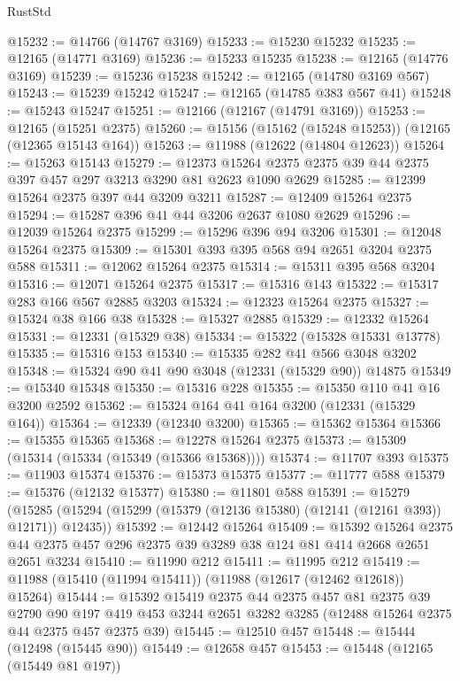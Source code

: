 \begin{lexlean}{RustStd}
\begin{coremodule}
@15232 := @14766 (@14767 @3169)
@15233 := @15230 @15232
@15235 := @12165 (@14771 @3169)
@15236 := @15233 @15235
@15238 := @12165 (@14776 @3169)
@15239 := @15236 @15238
@15242 := @12165 (@14780 @3169 @567)
@15243 := @15239 @15242
@15247 := @12165 (@14785 @383 @567 @41)
@15248 := @15243 @15247
@15251 := @12166 (@12167 (@14791 @3169))
@15253 := @12165 (@15251 @2375)
@15260 := @15156 (@15162 (@15248 @15253)) (@12165 (@12365 @15143 @164))
@15263 := @11988 (@12622 (@14804 @12623))
@15264 := @15263 @15143
@15279 := @12373 @15264 @2375 @2375 @39 @44 @2375 @397 @457 @297 @3213 @3290 @81 @2623 @1090 @2629
@15285 := @12399 @15264 @2375 @397 @44 @3209 @3211
@15287 := @12409 @15264 @2375
@15294 := @15287 @396 @41 @44 @3206 @2637 @1080 @2629
@15296 := @12039 @15264 @2375
@15299 := @15296 @396 @94 @3206
@15301 := @12048 @15264 @2375
@15309 := @15301 @393 @395 @568 @94 @2651 @3204 @2375 @588
@15311 := @12062 @15264 @2375
@15314 := @15311 @395 @568 @3204
@15316 := @12071 @15264 @2375
@15317 := @15316 @143
@15322 := @15317 @283 @166 @567 @2885 @3203
@15324 := @12323 @15264 @2375
@15327 := @15324 @38 @166 @38
@15328 := @15327 @2885
@15329 := @12332 @15264
@15331 := @12331 (@15329 @38)
@15334 := @15322 (@15328 @15331 @13778)
@15335 := @15316 @153
@15340 := @15335 @282 @41 @566 @3048 @3202
@15348 := @15324 @90 @41 @90 @3048 (@12331 (@15329 @90)) @14875
@15349 := @15340 @15348
@15350 := @15316 @228
@15355 := @15350 @110 @41 @16 @3200 @2592
@15362 := @15324 @164 @41 @164 @3200 (@12331 (@15329 @164))
@15364 := @12339 (@12340 @3200)
@15365 := @15362 @15364
@15366 := @15355 @15365
@15368 := @12278 @15264 @2375
@15373 := @15309 (@15314 (@15334 (@15349 (@15366 @15368))))
@15374 := @11707 @393
@15375 := @11903 @15374
@15376 := @15373 @15375
@15377 := @11777 @588
@15379 := @15376 (@12132 @15377)
@15380 := @11801 @588
@15391 := @15279
    (@15285 (@15294 (@15299 (@15379 (@12136 @15380) (@12141 (@12161 @393)) @12171)) @12435))
@15392 := @12442 @15264
@15409 := @15392
    @15264
    @2375
    @44
    @2375
    @457
    @296
    @2375
    @39
    @3289
    @38
    @124
    @81
    @414
    @2668
    @2651
    @2651
    @3234
@15410 := @11990 @212
@15411 := @11995 @212
@15419 := @11988 (@15410 (@11994 @15411)) (@11988 (@12617 (@12462 @12618)) @15264)
@15444 := @15392
    @15419
    @2375
    @44
    @2375
    @457
    @81
    @2375
    @39
    @2790
    @90
    @197
    @419
    @453
    @3244
    @2651
    @3282
    @3285
    (@12488 @15264 @2375 @44 @2375 @457 @2375 @39)
@15445 := @12510 @457
@15448 := @15444 (@12498 (@15445 @90))
@15449 := @12658 @457
@15453 := @15448 (@12165 (@15449 @81 @197))

\end{coremodule}
\end{lexlean}

